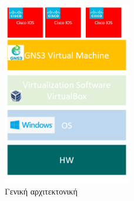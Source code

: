 \begin{figure}[htb]
	\centering
	\includegraphics[width=0.5\textwidth]{graphics/virtualization_architecture.PNG}
	\caption{ Γενική αρχιτεκτονική}
\end{figure}








